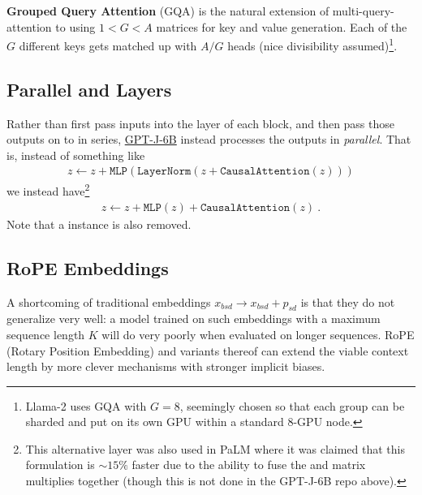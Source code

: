 \documentclass[11pt]{article}
\begin{document}
\textbf{Grouped Query Attention} (GQA) \cite{ainslie2023gqa} is the natural extension of
multi-query-attention to using $ 1<G<A $ matrices for key and value generation. Each of the $G$
different keys gets matched up with $A/G$ heads (nice divisibility assumed)\footnote{Llama-2
    \cite{touvron2023llama2} uses GQA with $ G=8 $, seemingly chosen so that each group can be
sharded and put on its own GPU within a standard 8-GPU node.}.


\subsection{Parallel  and  Layers}

Rather than first pass inputs into the  layer of each block, and then pass
those outputs on to  in series, \href{https://github.com/kingoflolz/mesh-transformer-jax/blob/f8315e3003033b23f21d78361b288953064e0e76/mesh_transformer/layers.py#L303}{GPT-J-6B}
instead processes the  outputs in \textit{parallel}. That is, instead of something
like
\begin{align}
	z \leftarrow z + \texttt{MLP}\left ( \texttt{LayerNorm}\left ( z + \texttt{CausalAttention}\left ( z \right ) \right ) \right )
\end{align}
we instead have\footnote{This alternative layer was also used in PaLM \cite{chowdhery2022palm} where it
	was claimed that this formulation is $\sim 15\%$ faster due to the ability to fuse the 
	and  matrix multiplies together (though this is not done in the GPT-J-6B repo above).}
\begin{align}
	z \leftarrow z + \texttt{MLP}\left ( z \right )    + \texttt{CausalAttention}\left ( z \right )\ .
\end{align}
Note that a  instance is also removed.



\subsection{RoPE Embeddings}

A shortcoming of traditional embeddings $ x _{ bsd } \longrightarrow x _{ bsd } + p _{ sd } $ is
that they do not generalize very well: a model trained on such embeddings with a maximum sequence
length $ K $ will do very poorly when evaluated on longer sequences. RoPE (Rotary Position
Embedding) \cite{su2022roformer} and variants thereof can extend the viable context length by more
clever mechanisms with stronger implicit biases.
\end{document}
